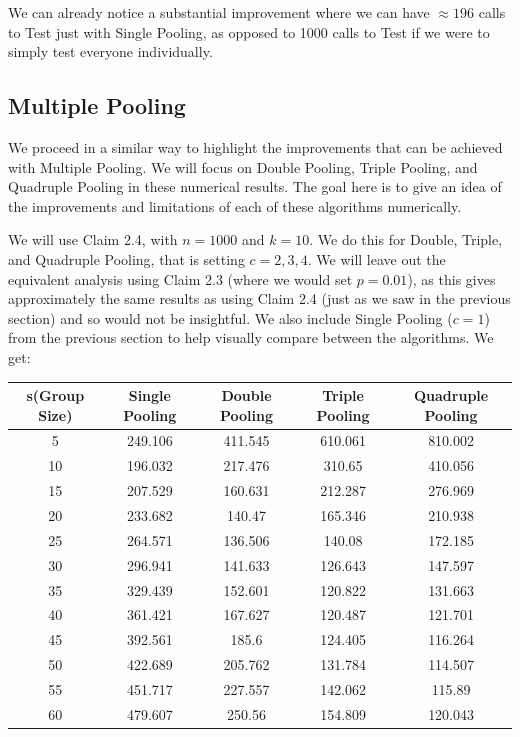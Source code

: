 \documentclass[12pt]{article}
\begin{document}
We can already notice a substantial improvement where we can have $\approx196$ calls to {\sf Test} just with Single Pooling, as opposed to 1000 calls to {\sf Test} if we were to simply test everyone individually.

\subsection{Multiple Pooling}
We proceed in a similar way to highlight the improvements that can be achieved with Multiple Pooling. 
We will focus on Double Pooling, Triple Pooling, and Quadruple Pooling in these numerical results. The goal here is to give an idea of the improvements and limitations of each of these algorithms numerically.

We will use Claim 2.4, with $n=1000$ and $k=10$. We do this for Double, Triple, and Quadruple Pooling, that is setting $c=2,3,4$. We will leave out the equivalent analysis using Claim 2.3 (where we would set $p=0.01$), as this gives approximately the same results as using Claim 2.4 (just as we saw in the previous section) and so would not be insightful. 
We also include Single Pooling ($c=1$) from the previous section to help visually compare between the algorithms.
We get:

\begin{center}
 \begin{tabular}{||c c c c c||} 

 \hline
 s(Group Size) & Single Pooling & Double Pooling & Triple Pooling & Quadruple Pooling \\ [0.5ex] 
 \hline\hline
 5 & 249.106 & 411.545 & 610.061 & 810.002 \\ 
 \hline
 10 & \cellcolor{green}196.032 & 217.476 & 310.65 & 410.056 \\
 \hline
 15 & 207.529 & 160.631 & 212.287 & 276.969 \\
 \hline
 20 & 233.682 & 140.47 & 165.346 & 210.938 \\
 \hline
  25 & 264.571 & \cellcolor{green}136.506 & 140.08 & 172.185 \\
 \hline
  30 & 296.941 & 141.633 & 126.643 & 147.597 \\ 
 \hline
  35 & 329.439 & 152.601 & 120.822 & 131.663 \\
 \hline
  40 & 361.421 & 167.627 & \cellcolor{green}120.487 & 121.701 \\
 \hline
  45 & 392.561 & 185.6 & 124.405 & 116.264 \\
 \hline
 50 & 422.689 & 205.762 & 131.784 & \cellcolor{green}114.507 \\
 \hline
 55 & 451.717 & 227.557 & 142.062 & 115.89 \\
 \hline
 60 & 479.607 & 250.56 & 154.809 & 120.043 \\
 \hline
\end{tabular}
\end{center}
\end{document}
